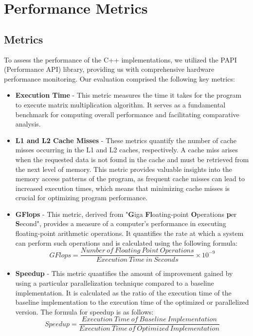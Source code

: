 \section{Performance Metrics}
\label{sec:metrics}

\subsection{Metrics}
To assess the performance of the C++ implementations, we
utilized the PAPI (Performance API) library, providing us with comprehensive
hardware performance monitoring. Our evaluation comprised the
following key metrics:

\begin{itemize}
    \item \textbf{Execution Time} - This metric measures the time it takes for the program to execute matrix multiplication algorithm. 
          It serves as a fundamental
          benchmark for computing overall performance
          and facilitating comparative analysis.

    \item \textbf{L1 and L2 Cache Misses} - These metrics quantify the number 
        of cache misses occurring in the L1 and L2 caches, respectively. 
        A cache miss arises when the requested data is not found in the cache 
        and must be retrieved from the next level of memory. This metric
          provides valuable insights into the memory access patterns
          of the program, as frequent cache misses can lead to
          increased execution times, which means that
          minimizing cache misses is crucial for optimizing
          program performance.

    \item \textbf{GFlops} - This metric, derived from "\textbf{G}iga
          \textbf{Fl}oating-point \textbf{O}perations \textbf{p}er \textbf{S}econd", provides a measure of a
          computer's performance in executing floating-point arithmetic
          operations. It quantifies the rate at which a system can
          perform such operations and is calculated using the following formula:
          \begin{equation}
              GFlops = \frac{Number\ of\ Floating\ Point\ Operations}{Execution\ Time\ in\ Seconds} \times 10^{-9}
          \end{equation}

    \item \textbf{Speedup} - This metric quantifies the
          amount of improvement gained by using a particular
          parallelization technique compared to a baseline
          implementation. It is calculated as the ratio of
          the execution time of the baseline implementation
          to the execution time of the optimized or parallelized
          version. The formula for speedup is as follows:
          \begin{equation}
              Speedup = \frac{Execution\ Time\ of\ Baseline\ Implementation}{Execution\ Time\ of\ Optimized\ Implementation}
          \end{equation}



\end{itemize}
